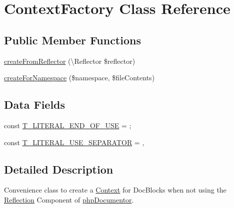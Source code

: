 \hypertarget{classphp_documentor_1_1_reflection_1_1_types_1_1_context_factory}{}\section{Context\+Factory Class Reference}
\label{classphp_documentor_1_1_reflection_1_1_types_1_1_context_factory}
\subsection*{Public Member Functions}
\begin{DoxyCompactItemize}
\item 
\mbox{\hyperlink{classphp_documentor_1_1_reflection_1_1_types_1_1_context_factory_aaa1a8014f30b57632a58afadeca8e90a}{create\+From\+Reflector}} (\textbackslash{}Reflector \$reflector)
\item 
\mbox{\hyperlink{classphp_documentor_1_1_reflection_1_1_types_1_1_context_factory_ac92207472f938f572b9a9503659ea4c7}{create\+For\+Namespace}} (\$namespace, \$file\+Contents)
\end{DoxyCompactItemize}
\subsection*{Data Fields}
\begin{DoxyCompactItemize}
\item 
const \mbox{\hyperlink{classphp_documentor_1_1_reflection_1_1_types_1_1_context_factory_a96cca9435b3576f1f4367a7980ef2610}{T\+\_\+\+L\+I\+T\+E\+R\+A\+L\+\_\+\+E\+N\+D\+\_\+\+O\+F\+\_\+\+U\+SE}} = \textquotesingle{};\textquotesingle{}
\item 
const \mbox{\hyperlink{classphp_documentor_1_1_reflection_1_1_types_1_1_context_factory_a896f247acbe1978d2b1d8bb69ad28004}{T\+\_\+\+L\+I\+T\+E\+R\+A\+L\+\_\+\+U\+S\+E\+\_\+\+S\+E\+P\+A\+R\+A\+T\+OR}} = \textquotesingle{},\textquotesingle{}
\end{DoxyCompactItemize}


\subsection{Detailed Description}
Convenience class to create a \mbox{\hyperlink{classphp_documentor_1_1_reflection_1_1_types_1_1_context}{Context}} for Doc\+Blocks when not using the \mbox{\hyperlink{namespacephp_documentor_1_1_reflection}{Reflection}} Component of \mbox{\hyperlink{namespacephp_documentor}{php\+Documentor}}.

